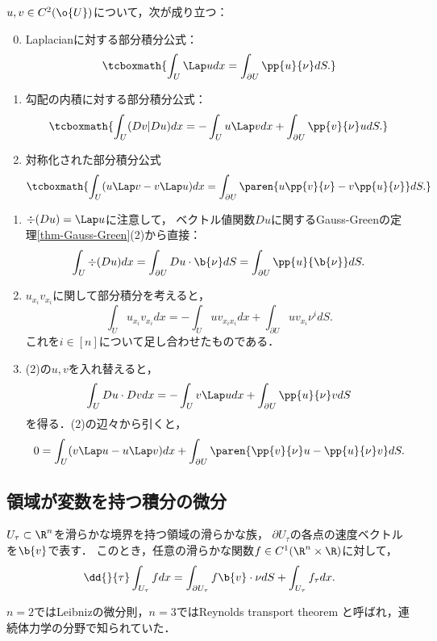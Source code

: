 \documentclass[uplatex,dvipdfmx]{jsreport}
\begin{document}
\begin{corollary}[Greenの恒等式]\label{cor-Green-identity}
    $u,v\in C^2(\o{U})$について，次が成り立つ：
    \begin{enumerate}\setcounter{enumi}{-1}
        \item Laplacianに対する部分積分公式：
        \[\tcboxmath{\int_U\Lap udx=\int_{\partial U}\pp{u}{\nu}dS.}\]
        \item 勾配の内積に対する部分積分公式：
        \[\tcboxmath{\int_U(Dv|Du)dx=-\int_Uu\Lap vdx+\int_{\partial U}\pp{v}{\nu}udS.}\]
        \item 対称化された部分積分公式
        \[\tcboxmath{\int_U(u\Lap v-v\Lap u)dx=\int_{\partial U}\paren{u\pp{v}{\nu}-v\pp{u}{\nu}}dS.}\]
    \end{enumerate}
\end{corollary}
\begin{Proof}\mbox{}
    \begin{enumerate}
        \item 
        $\div(Du)=\Lap u$に注意して，
        ベクトル値関数$Du$に関するGauss-Greenの定理\ref{thm-Gauss-Green}(2)から直接：
        \[\int_U\div(Du)dx=\int_{\partial U}Du\cdot\b{\nu}dS=\int_{\partial U}\pp{u}{\b{\nu}}dS.\]
        \item $u_{x_i}v_{x_i}$に関して部分積分を考えると，
        \[\int_{U}u_{x_i}v_{x_i}dx=-\int_Uuv_{x_ix_i}dx+\int_{\partial U}uv_{x_i}\nu^idS.\]
        これを$i\in[n]$について足し合わせたものである．
        \item (2)の$u,v$を入れ替えると，
        \[\int_UDu\cdot Dvdx=-\int_Uv\Lap udx+\int_{\partial U}\pp{u}{\nu}vdS\]
        を得る．(2)の辺々から引くと，
        \[0=\int_U(v\Lap u-u\Lap v)dx+\int_{\partial U}\paren{\pp{v}{\nu}u-\pp{u}{\nu}v}dS.\]
    \end{enumerate}
\end{Proof}

\subsection{領域が変数を持つ積分の微分}

\begin{theorem}\label{thm-differentiation-of-integral-on-moving-region}
    $U_\tau\subset\R^n$を滑らかな境界を持つ領域の滑らかな族，
    $\partial U_\tau$の各点の速度ベクトルを$\b{v}$で表す．
    このとき，任意の滑らかな関数$f\in C^1(\R^n\times\R)$に対して，
    \[\dd{}{\tau}\int_{U_\tau}fdx=\int_{\partial U_\tau}f\b{v}\cdot\nu dS+\int_{U_\tau}f_\tau dx.\]
\end{theorem}
\begin{history}
    $n=2$ではLeibnizの微分則，$n=3$ではReynolds transport theorem
    と呼ばれ，連続体力学の分野で知られていた．
\end{history}
\end{document}
